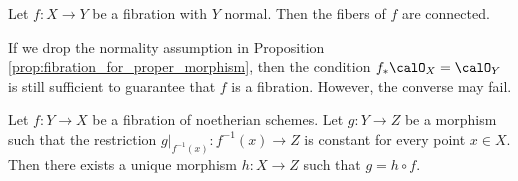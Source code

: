     \begin{proposition}\label{prop:fibration_and_connected_fibers}
        Let \(f: X \to Y\) be a fibration with \(Y\) normal.
        Then the fibers of \(f\) are connected.
    \end{proposition}

    \begin{remark}%
        If we drop the normality assumption in Proposition \ref{prop:fibration_for_proper_morphism}, then the condition \(f_*\calO_X = \calO_Y\) is still sufficient to guarantee that \(f\) is a fibration.
        However, the converse may fail.

    \end{remark}




    \begin{theorem}\label{thm:rigidity_lemma}
        Let \(f: Y \to X\) be a fibration of noetherian schemes.
        Let \(g: Y \to Z\) be a morphism such that the restriction \(g|_{f^{-1}(x)} : f^{-1}(x) \to Z\) is constant for every point \(x \in X\).
        Then there exists a unique morphism \(h: X \to Z\) such that \(g = h \circ f\).
        \Yang{}
    \end{theorem}





